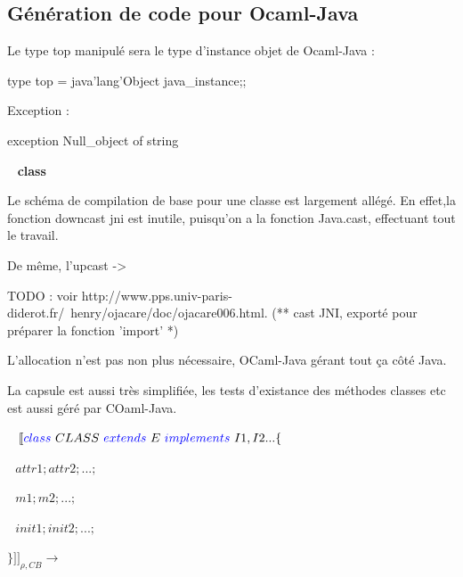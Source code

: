 \documentclass[a4paper, 11pt, notitlepage]{article}
\begin{document}
 














\subsection{Génération de code pour Ocaml-Java}
 
Le type top manipulé sera le type d'instance objet de Ocaml-Java :
\begin{OCamlEx}
type top = java'lang'Object java_instance;;
\end{OCamlEx}

Exception :
\begin{OCamlEx}
exception Null_object of string
\end{OCamlEx}




\ 
\newline
\textbf{class}

Le schéma de compilation de base pour une classe est largement allégé. 
En effet,la fonction downcast jni est inutile, puisqu'on a la fonction Java.cast, effectuant tout le travail.

De même, l'upcast -> 

TODO : voir http://www.pps.univ-paris-diderot.fr/~henry/ojacare/doc/ojacare006.html. (** cast JNI, exporté pour préparer la fonction 'import' *)

L'allocation n'est pas non plus nécessaire, OCaml-Java gérant tout ça côté Java. 

La capsule est aussi très simplifiée, les tests d'existance des méthodes classes etc est aussi géré par COaml-Java.

\ 
\newline
\noindent
$[\![ {\color{blue}class}\ CLASS\ 
 {\color{blue}extends}\  E \ 
 {\color{blue}implements}\  I1,I2... \{$

 $ \ \ \ attr1; attr2; ...;$

  $\ \ \ m1; m2; ...;$

  $\ \ \ init1; init2; ...;$

 $\} ]\!]_{\rho,CB}\longrightarrow$
\ 
\newline
\end{document}
